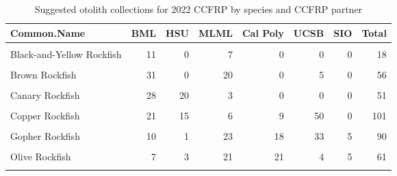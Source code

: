 \documentclass[
]{article}
\begin{document}
\begin{table}

\caption{\label{tab:collections}Suggested otolith collections for 2022 CCFRP by species and CCFRP partner}
\centering
\begin{tabular}[t]{lrrrrrrr}
\toprule
Common.Name & BML & HSU & MLML & Cal Poly & UCSB & SIO & Total\\
\midrule
\cellcolor{gray!6}{Black Rockfish} & \cellcolor{gray!6}{10} & \cellcolor{gray!6}{11} & \cellcolor{gray!6}{30} & \cellcolor{gray!6}{0} & \cellcolor{gray!6}{0} & \cellcolor{gray!6}{0} & \cellcolor{gray!6}{51}\\
Black-and-Yellow Rockfish & 11 & 0 & 7 & 0 & 0 & 0 & 18\\
\cellcolor{gray!6}{Blue Rockfish} & \cellcolor{gray!6}{10} & \cellcolor{gray!6}{3} & \cellcolor{gray!6}{23} & \cellcolor{gray!6}{15} & \cellcolor{gray!6}{50} & \cellcolor{gray!6}{0} & \cellcolor{gray!6}{101}\\
Brown Rockfish & 31 & 0 & 20 & 0 & 5 & 0 & 56\\
\cellcolor{gray!6}{Calico Rockfish} & \cellcolor{gray!6}{0} & \cellcolor{gray!6}{0} & \cellcolor{gray!6}{0} & \cellcolor{gray!6}{4} & \cellcolor{gray!6}{0} & \cellcolor{gray!6}{16} & \cellcolor{gray!6}{20}\\
\addlinespace
Canary Rockfish & 28 & 20 & 3 & 0 & 0 & 0 & 51\\
\cellcolor{gray!6}{China Rockfish} & \cellcolor{gray!6}{19} & \cellcolor{gray!6}{9} & \cellcolor{gray!6}{23} & \cellcolor{gray!6}{0} & \cellcolor{gray!6}{0} & \cellcolor{gray!6}{0} & \cellcolor{gray!6}{51}\\
Copper Rockfish & 21 & 15 & 6 & 9 & 50 & 0 & 101\\
\cellcolor{gray!6}{Deacon Rockfish} & \cellcolor{gray!6}{38} & \cellcolor{gray!6}{13} & \cellcolor{gray!6}{1} & \cellcolor{gray!6}{0} & \cellcolor{gray!6}{0} & \cellcolor{gray!6}{0} & \cellcolor{gray!6}{52}\\
Gopher Rockfish & 10 & 1 & 23 & 18 & 33 & 5 & 90\\
\addlinespace
\cellcolor{gray!6}{Kelp Rockfish} & \cellcolor{gray!6}{0} & \cellcolor{gray!6}{0} & \cellcolor{gray!6}{11} & \cellcolor{gray!6}{17} & \cellcolor{gray!6}{7} & \cellcolor{gray!6}{5} & \cellcolor{gray!6}{40}\\
Olive Rockfish & 7 & 3 & 21 & 21 & 4 & 5 & 61\\
\cellcolor{gray!6}{Quillback Rockfish} & \cellcolor{gray!6}{4} & \cellcolor{gray!6}{13} & \cellcolor{gray!6}{0} & \cellcolor{gray!6}{0} & \cellcolor{gray!6}{0} & \cellcolor{gray!6}{0} & \cellcolor{gray!6}{17}\\

\end{tabular}
\end{table}
\end{document}
